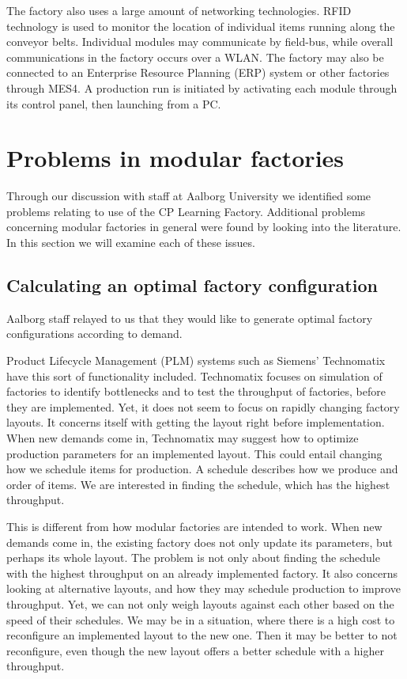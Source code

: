 The factory also uses a large amount of networking technologies. RFID technology is used to monitor the location of individual items running along the conveyor belts. Individual modules may communicate by field-bus, while overall communications in the factory occurs over a WLAN. The factory may also be connected to an Enterprise Resource Planning (ERP) system or other factories through MES4. A production run is initiated by activating each module through its control panel, then launching from a PC.

\section{Problems in modular factories}
Through our discussion with staff at Aalborg University we identified some problems relating to use of the CP Learning Factory. Additional problems concerning modular factories in general were found by looking into the literature. In this section we will examine each of these issues. 

\subsection{Calculating an optimal factory configuration}
Aalborg staff relayed to us that they would like to generate optimal factory configurations according to demand. 

Product Lifecycle Management (PLM) systems such as Siemens' Technomatix \cite{Siemens2014} have this sort of functionality included. Technomatix focuses on simulation of factories to identify bottlenecks and to test the throughput of factories, before they are implemented. Yet, it does not seem to focus on rapidly changing factory layouts. It concerns itself with getting the layout right before implementation. When new demands come in, Technomatix may suggest how to optimize production parameters for an implemented layout. This could entail changing how we schedule items for production. A schedule describes how we produce and order of items. We are interested in finding the schedule, which has the highest throughput. 

This is different from how modular factories are intended to work. When new demands come in, the existing factory does not only update its parameters, but perhaps its whole layout. The problem is not only about finding the schedule with the highest throughput on an already implemented factory. It also concerns looking at alternative layouts, and how they may schedule production to improve throughput. Yet, we can not only weigh layouts against each other based on the speed of their schedules. We may be in a situation, where there is a high cost to reconfigure an implemented layout to the new one. Then it may be better to not reconfigure, even though the new layout offers a better schedule with a higher throughput. 

